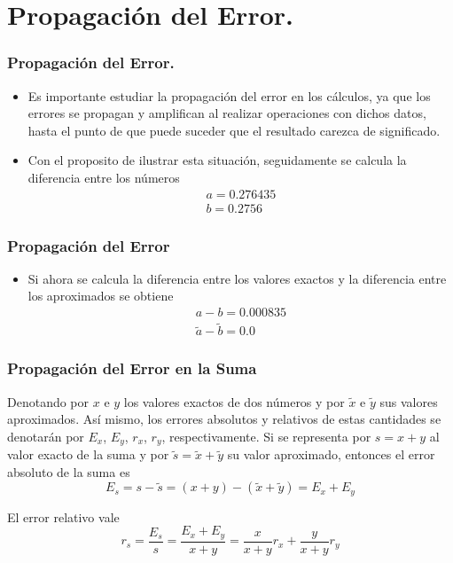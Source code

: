 \documentclass{beamer}
\begin{document}
\section{Propagaci\'on del Error.}
\frame
{
  \frametitle{Propagaci\'on del Error.}
  \begin{itemize}
    \item<1-> Es importante estudiar la propagaci\'on del error en los c\'alculos, ya que los errores se propagan y amplifican al realizar operaciones con dichos datos, hasta el punto de que puede suceder que el resultado carezca de significado.
    \item<2-> Con el proposito de ilustrar esta situaci\'on, seguidamente se calcula la diferencia entre los n\'umeros
    $$
    \begin{array}{l}
     a= 0.276435\\
    b=0.2756
    \end{array}
    $$
  \end{itemize}
}
\frame
{\frametitle{Propagaci\'on del Error}
\begin{itemize}
  \item Si ahora se calcula la diferencia entre los valores exactos y la diferencia entre los aproximados se obtiene
  $$
  \begin{array}{l}
   a-b= 0.000835\\
  \tilde a-\tilde b=0.0
  \end{array}
  $$
\end{itemize}
}
\frame
{
\frametitle{Propagaci\'on del Error en la Suma}

Denotando por $x$ e $y$ los valores exactos de dos n\'umeros y por $\tilde x$ e $\tilde y$ sus valores aproximados. As\'i mismo, los errores absolutos y relativos de estas cantidades se denotar\'an por $E_x$, $E_y$, $r_x$, $r_y$, respectivamente. Si se representa por $s = x + y$ al valor exacto de la suma y por $\tilde s = \tilde x + \tilde y$ su valor aproximado, entonces el error absoluto de la suma es
$$
E_s = s -\tilde s = (x + y) - (\tilde x + \tilde y) = E_x + E_y
$$

El error relativo vale
$$
r_s = \frac{E_s}{s} = \frac{E_x+E_y}{x+y} = \frac{x}{x+y}r_x + \frac{y}{x+y}r_y
$$
}
\end{document}
